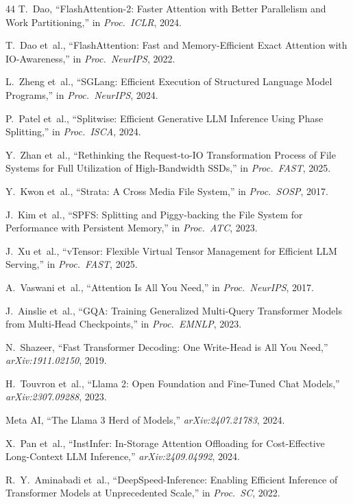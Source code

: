 \documentclass[conference]{IEEEtran}
\begin{document}
\begin{thebibliography}{44}
 T.~Dao, ``FlashAttention-2: Faster Attention with Better Parallelism and Work Partitioning,'' in \textit{Proc.\ ICLR}, 2024.

 T.~Dao et~al., ``FlashAttention: Fast and Memory-Efficient Exact Attention with IO-Awareness,'' in \textit{Proc.\ NeurIPS}, 2022.

 L.~Zheng et~al., ``SGLang: Efficient Execution of Structured Language Model Programs,'' in \textit{Proc.\ NeurIPS}, 2024.

 P.~Patel et~al., ``Splitwise: Efficient Generative LLM Inference Using Phase Splitting,'' in \textit{Proc.\ ISCA}, 2024.

 Y.~Zhan et~al., ``Rethinking the Request-to-IO Transformation Process of File Systems for Full Utilization of High-Bandwidth SSDs,'' in \textit{Proc.\ FAST}, 2025.

 Y.~Kwon et~al., ``Strata: A Cross Media File System,'' in \textit{Proc.\ SOSP}, 2017.

 J.~Kim et~al., ``SPFS: Splitting and Piggy-backing the File System for Performance with Persistent Memory,'' in \textit{Proc.\ ATC}, 2023.

 J.~Xu et~al., ``vTensor: Flexible Virtual Tensor Management for Efficient LLM Serving,'' in \textit{Proc.\ FAST}, 2025.

 A.~Vaswani et~al., ``Attention Is All You Need,'' in \textit{Proc.\ NeurIPS}, 2017.

 J.~Ainslie et~al., ``GQA: Training Generalized Multi-Query Transformer Models from Multi-Head Checkpoints,'' in \textit{Proc.\ EMNLP}, 2023.

 N.~Shazeer, ``Fast Transformer Decoding: One Write-Head is All You Need,'' \textit{arXiv:1911.02150}, 2019.

 H.~Touvron et~al., ``Llama 2: Open Foundation and Fine-Tuned Chat Models,'' \textit{arXiv:2307.09288}, 2023.

 Meta AI, ``The Llama 3 Herd of Models,'' \textit{arXiv:2407.21783}, 2024.

 X.~Pan et~al., ``InstInfer: In-Storage Attention Offloading for Cost-Effective Long-Context LLM Inference,'' \textit{arXiv:2409.04992}, 2024.

 R.~Y.~Aminabadi et~al., ``DeepSpeed-Inference: Enabling Efficient Inference of Transformer Models at Unprecedented Scale,'' in \textit{Proc.\ SC}, 2022.


\end{thebibliography}
\end{document}
